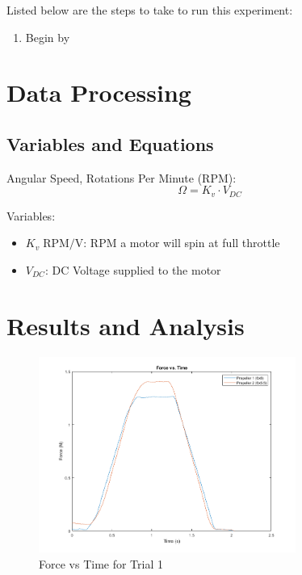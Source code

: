 \documentclass{article}
\begin{document}
Listed below are the steps to take to run this experiment:
\begin{enumerate}
  \item Begin by
\end{enumerate}

\section{Data Processing}

\subsection{Variables and Equations}  

Angular Speed, Rotations Per Minute (RPM):
\begin{equation}
    \Omega = K_{v}\cdot V_{DC}
\end{equation}

Variables:
\begin{itemize}
    \item \(K_{v}\; \text{RPM/V}\):  RPM a motor will spin at full throttle
    \item \(V_{DC}\): DC Voltage supplied to the motor
\end{itemize}
\vspace{5mm}

\section{Results and Analysis}

\begin{figure}[H]
  \centering
  \includegraphics[width = 0.75\textwidth]{finalprojectimages/Trial1_ForcevTime.png}
  \caption{Force vs Time for Trial 1}
  \label{fig:forcevtime}
\end{figure}
\end{document}
